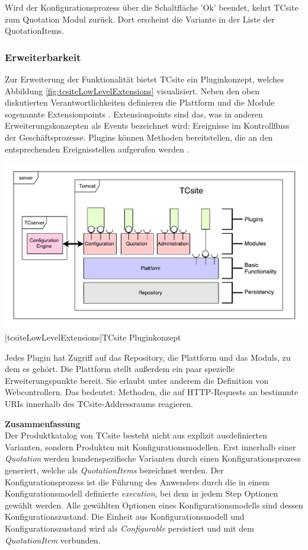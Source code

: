 \documentclass[12pt,a4paper,bibliography=totocnumbered,listof=totoc]{scrartcl}
\begin{document}
Wird der Konfigurationsprozess über die Schaltfläche 'Ok' beendet, kehrt TCsite zum Quotation Modul zurück. Dort erscheint die Variante in der Liste der QuotationItems.

\subsubsection{Erweiterbarkeit}
\label{subsubsection:Erweiterbarkeit}

Zur Erweiterung der Funktionalität bietet TCsite ein Pluginkonzept, welches Abbildung \ref{fig:tcsiteLowLevelExtensions} visualisiert. Neben den oben diskutierten Verantwortlichkeiten definieren die Plattform und die Module sogenannte Extensionpoints \citep{tactonTCsiteApiDocu}. Extensionpoints sind das, was in anderen Erweiterungskonzepten als Events bezeichnet wird: Ereignisse im Kontrollfluss der Geschäftsprozesse. Plugins können Methoden bereitstellen, die an den entsprechenden Ereignisstellen aufgerufen werden  \citep{tactonTCsiteDevelopmentManual}.

\vspace{1em}
\begin{minipage}{\linewidth}
	\centering
	\includegraphics[width=0.8\linewidth]{Abbildungen/tcsiteLowLevelExtensions.pdf}
	[tcsiteLowLevelExtensions]{TCsite Pluginkonzept}
	\label{fig:tcsiteLowLevelExtensions}
\end{minipage}
\vspace{1em}

Jedes Plugin hat Zugriff auf das Repository, die Plattform und das Moduls, zu dem es gehört. Die Plattform stellt außerdem ein paar spezielle Erweiterungspunkte bereit. Sie erlaubt unter anderem die Definition von Webcontrollern. Das bedeutet: Methoden, die auf HTTP-Requests an bestimmte URIs innerhalb des TCsite-Addressraums reagieren.

\textbf{Zusammenfassung}\\
Der Produktkatalog von TCsite besteht nicht aus explizit ausdefinierten Varianten, sondern Produkten mit Konfigurationsmodellen. Erst innerhalb einer \emph{Quotation} werden kundenspezifische Varianten durch einen Konfigurationsprozess generiert, welche als \emph{QuotationItems} bezeichnet werden. Der Konfigurationsprozess ist die Führung des Anwenders durch die in einem Konfigurationsmodell definierte \emph{execution}, bei dem in jedem Step Optionen gewählt werden. Alle gewählten Optionen eines Konfigurationsmodells sind dessen Konfigurationszustand. Die Einheit aus Konfigurationsmodell und Konfigurationszustand wird als \emph{Configurable} persistiert und mit dem \emph{QuotationItem} verbunden.
\end{document}
